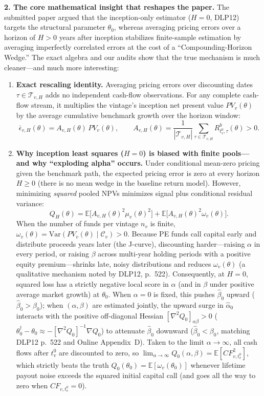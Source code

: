 \documentclass[11pt]{article}
\newcommand{\E}{\mathbb{E}}
\newcommand{\Var}{\mathrm{Var}}
\newcommand{\C}{\mathcal{C}}
\begin{document}
\textbf{2. The core mathematical insight that reshapes the paper.}
The submitted paper argued that the inception-only estimator ($H=0$, DLP12) targets the structural parameter $\theta_0$, whereas averaging pricing errors over a horizon of $H>0$ years after inception stabilizes finite-sample estimation by averaging imperfectly correlated errors at the cost of a ``Compounding-Horizon Wedge.'' The exact algebra and our audits show that the true mechanism is much cleaner—and much more interesting:
\begin{enumerate}
\item \textbf{Exact rescaling identity.} Averaging pricing errors over discounting dates $\tau\in\mathcal{T}_{v,H}$ adds no independent cash-flow observations. For any complete cash-flow stream, it multiplies the vintage's inception net present value $PV_v(\theta)$ by the average cumulative benchmark growth over the horizon window:
\[
\bar\epsilon_{v,H}(\theta)=A_{v,H}(\theta)\,PV_v(\theta),\qquad
A_{v,H}(\theta)=\frac{1}{|\mathcal{T}_{v,H}|}\sum_{\tau\in\mathcal{T}_{v,H}}R^b_{t_v^0,\tau}(\theta)>0.
\]
\item \textbf{Why inception least squares ($H=0$) is biased with finite pools—and why ``exploding alpha'' occurs.} Under conditional mean-zero pricing given the benchmark path, the expected pricing error is zero at every horizon $H\ge 0$ (there is no mean wedge in the baseline return model). However, minimizing \emph{squared} pooled NPVs minimizes signal plus conditional residual variance:
\[
Q_H(\theta)=\E\bigl[A_{v,H}(\theta)^2\mu_v(\theta)^2\bigr]+\E\bigl[A_{v,H}(\theta)^2\omega_v(\theta)\bigr].
\]
When the number of funds per vintage $n_v$ is finite, $\omega_v(\theta)=\Var(PV_v(\theta)\mid\C_v)>0$. Because PE funds call capital early and distribute proceeds years later (the J-curve), discounting harder—raising $\alpha$ in every period, or raising $\beta$ across multi-year holding periods with a positive equity premium—shrinks late, noisy distributions and reduces $\omega_v(\theta)$ (a qualitative mechanism noted by DLP12, p.~522). Consequently, at $H=0$, squared loss has a strictly negative local score in $\alpha$ (and in $\beta$ under positive average market growth) at $\theta_0$. When $\alpha=0$ is fixed, this pushes $\hat\beta_0$ upward ($\hat\beta_0>\beta_0$); when $(\alpha,\beta)$ are estimated jointly, the upward surge in $\hat\alpha_0$ interacts with the positive off-diagonal Hessian $[\nabla^2 Q_0]_{\alpha\beta}>0$ ($\theta_0^\dagger-\theta_0\approx-[\nabla^2 Q_0]^{-1}\nabla Q_0$) to attenuate $\hat\beta_0$ downward ($\hat\beta_0<\beta_0$, matching DLP12 p.~522 and Online Appendix~D). Taken to the limit $\alpha\to\infty$, all cash flows after $t_v^0$ are discounted to zero, so $\lim_{\alpha\to\infty}Q_0(\alpha,\beta)=\E[CF_{v,t_v^0}^2]$, which strictly beats the truth $Q_0(\theta_0)=\E[\omega_v(\theta_0)]$ whenever lifetime payout noise exceeds the squared initial capital call (and goes all the way to zero when $CF_{v,t_v^0}=0$).

\end{enumerate}
\end{document}
